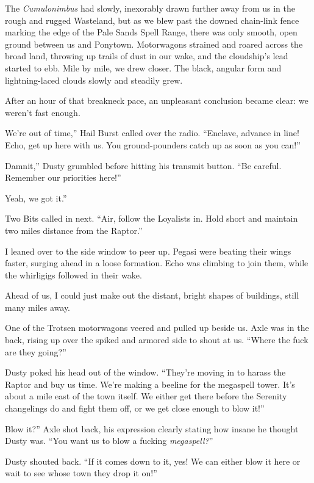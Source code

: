The \textit{Cumulonimbus} had slowly, inexorably drawn further away from us in the rough and rugged Wasteland, but as we blew past the downed chain-link fence marking the edge of the Pale Sands Spell Range, there was only smooth, open ground between us and Ponytown. Motorwagons strained and roared across the broad land, throwing up trails of dust in our wake, and the cloudship’s lead started to ebb. Mile by mile, we drew closer. The black, angular form and lightning-laced clouds slowly and steadily grew.

After an hour of that breakneck pace, an unpleasant conclusion became clear: we weren’t fast enough.

\leavevmode{}We’re out of time,” Hail Burst called over the radio. “Enclave, advance in line! Echo, get up here with us. You ground-pounders catch up as soon as you can!”

\leavevmode{}Damnit,” Dusty grumbled before hitting his transmit button. “Be careful. Remember our priorities here!”

\leavevmode{}Yeah, we got it.”

Two Bits called in next. “Air, follow the Loyalists in. Hold short and maintain two miles distance from the Raptor.”

I leaned over to the side window to peer up. Pegasi were beating their wings faster, surging ahead in a loose formation. Echo was climbing to join them, while the whirligigs followed in their wake.

Ahead of us, I could just make out the distant, bright shapes of buildings, still many miles away.

One of the Trotsen motorwagons veered and pulled up beside us. Axle was in the back, rising up over the spiked and armored side to shout at us. “Where the fuck are they going?”

Dusty poked his head out of the window. “They’re moving in to harass the Raptor and buy us time. We’re making a beeline for the megaspell tower. It’s about a mile east of the town itself. We either get there before the Serenity changelings do and fight them off, or we get close enough to blow it!”

\leavevmode{}Blow it?” Axle shot back, his expression clearly stating how insane he thought Dusty was. “You want us to blow a fucking \textit{megaspell?}”

Dusty shouted back. “If it comes down to it, yes! We can either blow it here or wait to see whose town they drop it on!”

